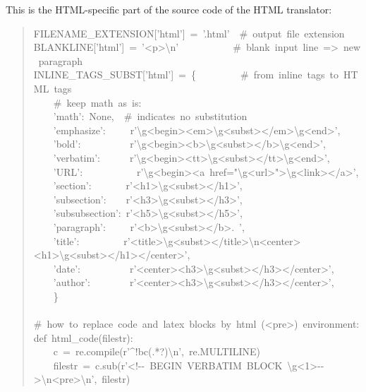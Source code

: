 \documentclass[a4paper]{article}
\begin{document}
This is the HTML-specific part of the
source code of the HTML translator:
%
\begin{quote}{\ttfamily \raggedright \noindent
FILENAME\_EXTENSION{[}'html'{]}~=~'.html'~~\#~output~file~extension\\
BLANKLINE{[}'html'{]}~=~'<p>\textbackslash{}n'~~~~~~~~~~~\#~blank~input~line~=>~new~paragraph\\
INLINE\_TAGS\_SUBST{[}'html'{]}~=~\{~~~~~~~~~\#~from~inline~tags~to~HTML~tags\\
~~~~\#~keep~math~as~is:\\
~~~~'math':~None,~~\#~indicates~no~substitution\\
~~~~'emphasize':~~~~~r'\textbackslash{}g<begin><em>\textbackslash{}g<subst></em>\textbackslash{}g<end>',\\
~~~~'bold':~~~~~~~~~~r'\textbackslash{}g<begin><b>\textbackslash{}g<subst></b>\textbackslash{}g<end>',\\
~~~~'verbatim':~~~~~~r'\textbackslash{}g<begin><tt>\textbackslash{}g<subst></tt>\textbackslash{}g<end>',\\
~~~~'URL':~~~~~~~~~~~r'\textbackslash{}g<begin><a~href="\textbackslash{}g<url>">\textbackslash{}g<link></a>',\\
~~~~'section':~~~~~~~r'<h1>\textbackslash{}g<subst></h1>',\\
~~~~'subsection':~~~~r'<h3>\textbackslash{}g<subst></h3>',\\
~~~~'subsubsection':~r'<h5>\textbackslash{}g<subst></h5>',\\
~~~~'paragraph':~~~~~r'<b>\textbackslash{}g<subst></b>.~',\\
~~~~'title':~~~~~~~~~r'<title>\textbackslash{}g<subst></title>\textbackslash{}n<center><h1>\textbackslash{}g<subst></h1></center>',\\
~~~~'date':~~~~~~~~~~r'<center><h3>\textbackslash{}g<subst></h3></center>',\\
~~~~'author':~~~~~~~~r'<center><h3>\textbackslash{}g<subst></h3></center>',\\
~~~~\}\\
~\\
\#~how~to~replace~code~and~latex~blocks~by~html~(<pre>)~environment:\\
def~html\_code(filestr):\\
~~~~c~=~re.compile(r'\textasciicircum{}!bc(.*?)\textbackslash{}n',~re.MULTILINE)\\
~~~~filestr~=~c.sub(r'<!-{}-~BEGIN~VERBATIM~BLOCK~\textbackslash{}g<1>-{}->\textbackslash{}n<pre>\textbackslash{}n',~filestr)\\
}
\end{quote}
\end{document}
